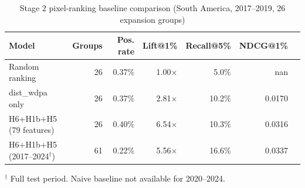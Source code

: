 \begin{table}[ht]
\centering
\caption{Stage 2 pixel-ranking baseline comparison (South America, 2017--2019, 26 expansion groups)}
\label{tab:stage2_baselines}
\begin{tabular}{lrrrrrr}
\hline
Model & Groups & Pos. rate & Lift@1\% & Recall@5\% & NDCG@1\% \\
\hline
Random ranking & 26 & 0.37\% & 1.00$\times$ & 5.0\% & nan \\
dist\_wdpa only & 26 & 0.37\% & 2.81$\times$ & 10.2\% & 0.0170 \\
H6+H1b+H5 (79 features) & 26 & 0.40\% & 6.54$\times$ & 10.3\% & 0.0316 \\
\hline
H6+H1b+H5 (2017--2024$^\dagger$) & 61 & 0.22\% & 5.56$\times$ & 16.6\% & 0.0337 \\
\hline
\end{tabular}
\begin{tablenotes}
\small
\item $^\dagger$ Full test period. Naive baseline not available for 2020--2024.
\end{tablenotes}
\end{table}